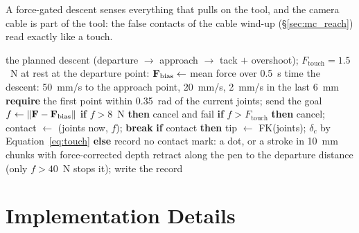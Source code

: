 A force-gated descent senses everything that pulls on the tool, and the camera cable is part of the tool:
the false contacts of the cable wind-up (\S\ref{sec:mc_reach}) read exactly like a touch.

\begin{algorithm}[htbp]
\caption{Force-gated descent and the contact record}
\label{alg:descent}
\begin{algorithmic}[1]
\REQUIRE the planned descent (departure $\to$ approach $\to$ tack $+$ overshoot); $F_{\mathrm{touch}}=1.5$~N
\STATE at rest at the departure point: $\mathbf{F}_{\mathrm{bias}}\gets$ mean force over 0.5~s
\STATE time the descent: 50~mm/s to the approach point, 20~mm/s, 2~mm/s in the last 6~mm
\STATE \textbf{require} the first point within 0.35~rad of the current joints; send the goal
  \STATE $f\gets\left\lVert\mathbf{F}-\mathbf{F}_{\mathrm{bias}}\right\rVert$
  \STATE \textbf{if} $f>8$~N \textbf{then} cancel and fail
  \STATE \textbf{if} $f>F_{\mathrm{touch}}$ \textbf{then} cancel; contact $\gets$ (joints now, $f$); \textbf{break}
\ENDWHILE
\STATE \textbf{if} contact \textbf{then} tip $\gets$ FK(joints); $\delta_c$ by Equation~\ref{eq:touch} \textbf{else} record no contact
\STATE mark: a dot, or a stroke in 10~mm chunks with force-corrected depth
\STATE retract along the pen to the departure distance (only $f>40$~N stops it); write the record
\end{algorithmic}
\end{algorithm}

\section{Implementation Details}
\label{sec:mc_impl}

